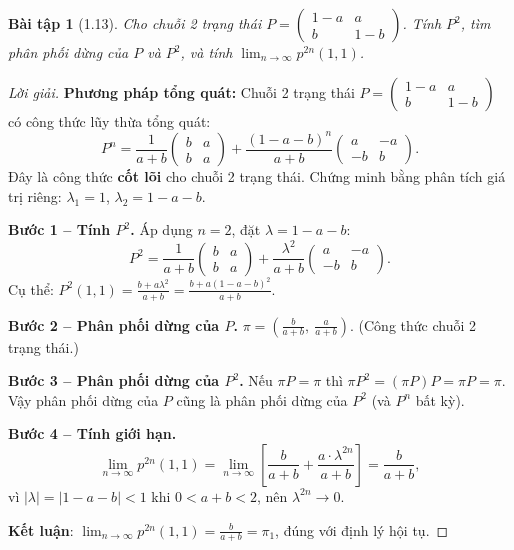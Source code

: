 \documentclass[8pt,a4paper]{article}
\newtheorem{exercise}{Bài tập}
\newenvironment{solution}{\begin{proof}[Lời giải]}{\end{proof}}
\begin{document}
\begin{exercise}[1.13]
Cho chuỗi 2 trạng thái $P = \begin{pmatrix} 1-a & a \\ b & 1-b \end{pmatrix}$. Tính $P^2$, tìm phân phối dừng của $P$ và $P^2$, và tính $\lim_{n\to\infty} p^{2n}(1,1)$.
\end{exercise}
\begin{solution}
\textbf{Phương pháp tổng quát:} Chuỗi 2 trạng thái $P = \begin{pmatrix} 1-a & a \\ b & 1-b \end{pmatrix}$ có công thức lũy thừa tổng quát:
\[
  P^n = \frac{1}{a+b}\begin{pmatrix} b & a \\ b & a \end{pmatrix} + \frac{(1-a-b)^n}{a+b}\begin{pmatrix} a & -a \\ -b & b \end{pmatrix}.
\]
Đây là công thức \textbf{cốt lõi} cho chuỗi 2 trạng thái. Chứng minh bằng phân tích giá trị riêng: $\lambda_1 = 1$, $\lambda_2 = 1-a-b$.

\textbf{Bước 1 -- Tính $P^2$.}
Áp dụng $n=2$, đặt $\lambda = 1-a-b$:
\[
  P^2 = \frac{1}{a+b}\begin{pmatrix} b & a \\ b & a \end{pmatrix} + \frac{\lambda^2}{a+b}\begin{pmatrix} a & -a \\ -b & b \end{pmatrix}.
\]
Cụ thể: $P^2(1,1) = \frac{b + a\lambda^2}{a+b} = \frac{b + a(1-a-b)^2}{a+b}$.

\textbf{Bước 2 -- Phân phối dừng của $P$.}
$\pi = \left(\frac{b}{a+b},\ \frac{a}{a+b}\right)$. (Công thức chuỗi 2 trạng thái.)

\textbf{Bước 3 -- Phân phối dừng của $P^2$.}
Nếu $\pi P = \pi$ thì $\pi P^2 = (\pi P)P = \pi P = \pi$. Vậy phân phối dừng của $P$ cũng là phân phối dừng của $P^2$ (và $P^n$ bất kỳ).

\textbf{Bước 4 -- Tính giới hạn.}
\[
  \lim_{n\to\infty} p^{2n}(1,1) = \lim_{n\to\infty} \left[\frac{b}{a+b} + \frac{a \cdot \lambda^{2n}}{a+b}\right] = \frac{b}{a+b},
\]
vì $|\lambda| = |1-a-b| < 1$ khi $0 < a+b < 2$, nên $\lambda^{2n} \to 0$.

\textbf{Kết luận}: $\lim_{n\to\infty} p^{2n}(1,1) = \frac{b}{a+b} = \pi_1$, đúng với định lý hội tụ.
\end{solution}
\end{document}

